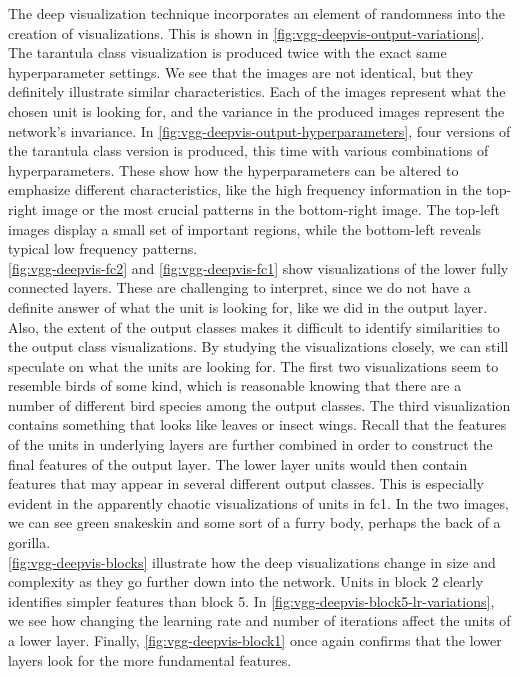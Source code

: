 \noindent The deep visualization technique incorporates an element of randomness into the creation of visualizations. This is shown in \autoref{fig:vgg-deepvis-output-variations}. The tarantula class visualization is produced twice with the exact same hyperparameter settings. We see that the images are not identical, but they definitely illustrate similar characteristics. Each of the images represent what the chosen unit is looking for, and the variance in the produced images represent the network's invariance. In \autoref{fig:vgg-deepvis-output-hyperparameters}, four versions of the tarantula class version is produced, this time with various combinations of hyperparameters. These show how the hyperparameters can be altered to emphasize different characteristics, like the high frequency information in the top-right image or the most crucial patterns in the bottom-right image. The top-left images display a small set of important regions, while the bottom-left reveals typical low frequency patterns. \\

\noindent \autoref{fig:vgg-deepvis-fc2} and \autoref{fig:vgg-deepvis-fc1} show visualizations of the lower fully connected layers. These are challenging to interpret, since we do not have a definite answer of what the unit is looking for, like we did in the output layer. Also,  the extent of the output classes makes it difficult to identify similarities to the output class visualizations. By studying the visualizations closely, we can still speculate on what the units are looking for. The first two visualizations seem to resemble birds of some kind, which is reasonable knowing that there are a number of different bird species among the output classes. The third visualization contains something that looks like leaves or insect wings. Recall that the features of the units in underlying layers are further combined in order to construct the final features of the output layer. The lower layer units would then contain features that may appear in several different output classes. This is especially evident in the apparently chaotic visualizations of units in fc1. In the two images, we can see green snakeskin and some sort of a furry body, perhaps the back of a gorilla. \\ %

\noindent \autoref{fig:vgg-deepvis-blocks} illustrate how the deep visualizations change in size and complexity as they go further down into the network. Units in block 2 clearly identifies simpler features than block 5. In \autoref{fig:vgg-deepvis-block5-lr-variations}, we see how changing the learning rate and number of iterations affect the units of a lower layer. %
Finally, \autoref{fig:vgg-deepvis-block1} once again confirms that the lower layers look for the more fundamental features. %

